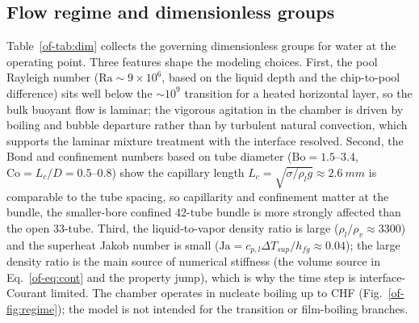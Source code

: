 \documentclass[11pt]{article}
\begin{document}
\subsection{Flow regime and dimensionless groups}
\label{of-sec:dimensionless}
Table~\ref{of-tab:dim} collects the governing dimensionless groups for water at the operating
point. Three features shape the modeling choices. First, the pool Rayleigh number
($\mathrm{Ra}\sim9\times10^6$, based on the liquid depth and the chip-to-pool difference)
sits well below the $\sim10^9$ transition for a heated horizontal layer, so the bulk
buoyant flow is laminar; the vigorous agitation in the chamber is driven by boiling and
bubble departure rather than by turbulent natural convection, which supports the laminar
mixture treatment with the interface resolved. Second, the Bond and confinement numbers
based on tube diameter ($\mathrm{Bo}=1.5$--$3.4$, $\mathrm{Co}=L_c/D=0.5$--$0.8$) show the
capillary length $L_c=\sqrt{\sigma/\rho_l g}\approx\SI{2.6}{mm}$ is comparable to the tube
spacing, so capillarity and confinement matter at the bundle, the smaller-bore confined
42-tube bundle is more strongly affected than the open 33-tube. Third, the liquid-to-vapor
density ratio is large ($\rho_l/\rho_v\approx3300$) and the superheat Jakob number is small
($\mathrm{Ja}=c_{p,l}\Delta T_{sup}/h_{fg}\approx0.04$); the large density ratio is the main
source of numerical stiffness (the volume source in Eq.~\eqref{of-eq:cont} and the property
jump), which is why the time step is interface-Courant limited. The chamber operates in
nucleate boiling up to CHF (Fig.~\ref{of-fig:regime}); the model is not intended for the
transition or film-boiling branches.
\end{document}
